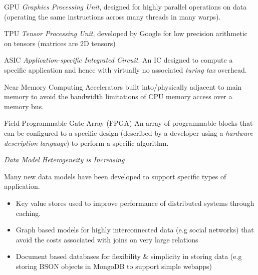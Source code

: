 \begin{tcbraster}[raster columns=2,raster equal height]
\begin{definitionbox}{GPU}
    \textit{Graphics Processing Unit}, designed for highly parallel operations on data (operating the same instructions across many threads in many warps).
\end{definitionbox}
\begin{definitionbox}{TPU}
    \textit{Tensor Processing Unit}, developed by Google for low precision arithmetic on tensors (matrices are 2D tensors) 
\end{definitionbox}
\begin{definitionbox}{ASIC}
    \textit{Application-specific Integrated Circuit}. An IC designed to compute a specific application and hence with virtually no associated \textit{turing tax} overhead.
\end{definitionbox}
\begin{definitionbox}{Near Memory Computing}
    Accelerators built into/physically adjacent to main memory to avoid the bandwidth limitations of CPU memory access over a memory bus.
\end{definitionbox}
\end{tcbraster}
\begin{definitionbox}{Field Programmable Gate Array (FPGA)}
    An array of programmable blocks that can be configured to a specific design (described by a developer using a \textit{hardware description language}) to perform a specific algorithm.  
\end{definitionbox}
\centerline{\textit{Data Model Heterogeneity is Increasing}}
Many new data models have been developed to support specific types of application.
\begin{itemize}
    \item Key value stores used to improve performance of distributed systems through caching.
    \item Graph based models for highly interconnected data (e.g social networks) that avoid the costs associated with joins on very large relations
    \item Document based databases for flexibility \& simplicity in storing data (e.g storing BSON objects in MongoDB to support simple webapps)
\end{itemize}

